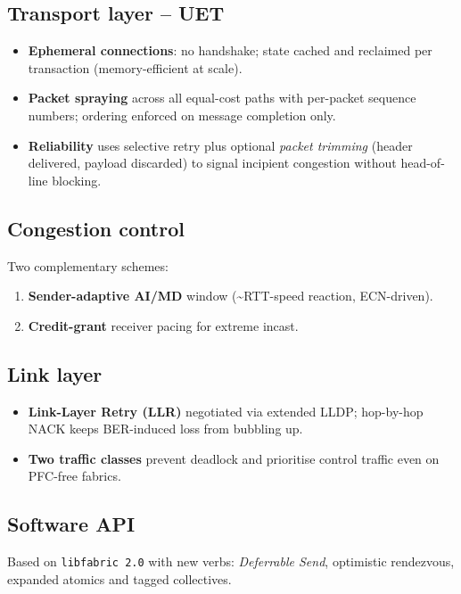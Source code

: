 \documentclass[../../../OAE-SPEC-MAIN.tex]{subfiles}
\begin{document}
\subsection*{Transport layer – UET}
\begin{itemize}
  \item \textbf{Ephemeral connections}: no handshake; state cached and
        reclaimed per transaction (memory-efficient at scale).
  \item \textbf{Packet spraying} across all equal-cost paths with per-packet
        sequence numbers; ordering enforced on message completion only.
  \item \textbf{Reliability} uses selective retry plus optional
        \emph{packet trimming} (header delivered, payload discarded)
        to signal incipient congestion without head-of-line
        blocking.
\end{itemize}

\subsection*{Congestion control}
Two complementary schemes:  
\begin{enumerate}[label={(\arabic*)},leftmargin=*]
  \item \textbf{Sender-adaptive AI/MD} window (\textasciitilde{}RTT-speed
        reaction, ECN-driven).  
  \item \textbf{Credit-grant} receiver pacing for extreme
        incast.
\end{enumerate}

\subsection*{Link layer}
\begin{itemize}
  \item \textbf{Link-Layer Retry (LLR)} negotiated via extended LLDP; hop-by-hop
        NACK keeps BER-induced loss from bubbling up.
  \item \textbf{Two traffic classes} prevent deadlock and prioritise control
        traffic even on PFC-free fabrics.
\end{itemize}

\subsection*{Software API}
Based on \texttt{libfabric 2.0} with new verbs:
\emph{Deferrable Send}, optimistic rendezvous, expanded atomics and tagged
collectives.
\end{document}
